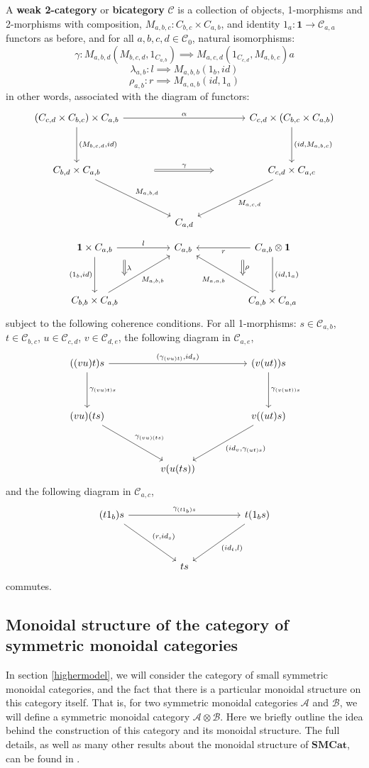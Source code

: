 \begin{defn}\label{bicat}
  A \textbf{weak 2-category} or \textbf{bicategory} $\mathcal{C}$ is a collection of objects, 1-morphisms and 2-morphisms with composition, $M_{a, b, c} : C_{b,c} \times C_{a,b}$, and identity $1_a : \mathbf{1} \to \mathcal{C}_{a,a}$ functors as before, and for all $a, b, c, d \in \mathcal{C}_0$, natural isomorphisms:
  \[
    \gamma :  M_{a,b,d} (M_{b,c,d}, 1_{C_{a,b}}) \implies M_{a, c, d}(1_{C_{c, d}}, M_{a, b, c}) a
  \]
  \[
    \lambda_{a,b} : l \implies M_{a, b, b} (1_b, id)
  \]
  \[
    \rho_{a,b} : r \implies M_{a, a, b}(id, 1_a)
  \]
  in other words, associated with the diagram of functors:
  \[
    \ti
    (C_{c, d} \times C_{b, c}) \times C_{a, b} \ar[d, "{(M_{b, c, d}, id)}"] \ar[rr, "\alpha"] & & C_{c, d} \times (C_{b, c} \times C_{a, b}) \ar[d, "{(id, M_{a, b, c})}"]\\
    C_{b, d} \times C_{a, b} \ar[rd, "M_{a, b, d}"] \ar[rr, "\gamma", Rightarrow, shorten <=50pt,shorten >=50pt]& & C_{c, d} \times C_{a, c} \ar[ld, "M_{a, c, d}"]\\
    & C_{a, d}      &
    \kz
  \]
  \[
    \ti
    \mathbf{1} \times C_{a, b} \ar[d, "{(1_b, id)}", swap] \ar[d, "\lambda", Rightarrow, xshift=30pt, shorten <=10pt,shorten >=10pt, yshift=7pt] \ar[r, "l"] & C_{a, b} & C_{a, b} \otimes \mathbf{1} \ar[l, "r"] \ar[d, "{(id, 1_a)}"] \ar[d, "\rho", Rightarrow, xshift=-30pt, shorten <=10pt,shorten >=10pt, yshift=7pt] \\
    C_{b, b} \times C_{a, b} \ar[ru, "M_{a, b, b}",swap] & & C_{a, b} \times C_{a, a} \ar[lu, "M_{a, a, b}"]
    \kz
  \]
  subject to the following coherence conditions. For all 1-morphisms: $s \in \mathcal{C}_{a,b}$, $t \in \mathcal{C}_{b, c}$, $u \in \mathcal{C}_{c,d}$, $v \in \mathcal{C}_{d,e}$, the following diagram in $\mathcal{C}_{a,e}$,
  \[
    \ti
    ((vu)t)s  \ar[rr, "{(\gamma_{(vu)t)}, id_s)}"] \ar[d, "\gamma_{(vu)t)s}"] & & (v(ut))s \ar[d, "\gamma_{(v(ut))s}"] \\
    (vu)(ts) \ar[dr, "\gamma_{(vu)(ts)}"] & & v((ut)s) \ar[ld, "{(id_v, \gamma_{(ut)s})}"]\\
    & v(u(ts)) & 
    \kz
  \]
  and the following diagram in $\mathcal{C}_{a,c}$,
  \[
    \ti
    (t1_b)s \ar[rr, "\gamma_{(t1_b)s}"] \ar[dr, "{(r,id_s)}"] & & t(1_bs) \ar[ld, "{(id_t, l)}"]\\
    & ts
    \kz
  \]
  commutes.
\end{defn}
\subsection{Monoidal structure of the category of symmetric monoidal categories}
In section \ref{highermodel}, we will consider the category of small symmetric monoidal categories, and the fact that there is a particular monoidal structure on this category itself. That is, for two symmetric monoidal categories $\mathcal{A}$ and $\mathcal{B}$, we will define a symmetric monoidal category $\mathcal{A} \otimes \mathcal{B}$. Here we briefly outline the idea behind the construction of this category and its monoidal structure. The full details, as well as many other results about the monoidal structure of $\mathbf{SMCat}$, can be found in \cite{smcat}.


